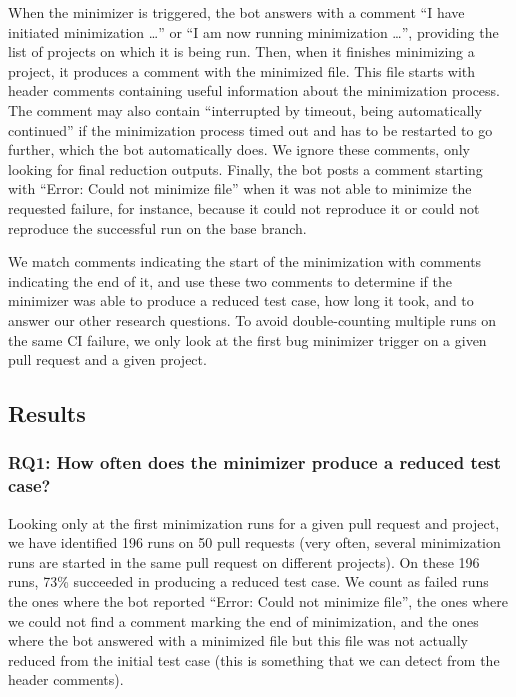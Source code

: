 \documentclass[a4paper,USenglish,cleveref,autoref,thm-restate]{lipics-v2021}
\begin{document}
When the minimizer is triggered, the bot answers with a comment ``I have initiated minimization \ldots'' or ``I am now running minimization \ldots'', providing the list of projects on which it is being run.
%
Then, when it finishes minimizing a project, it produces a comment with the minimized file.
%
This file starts with header comments containing useful information about the minimization process. %
%
The comment may also contain ``interrupted by timeout, being automatically continued'' if the minimization process timed out and has to be restarted to go further, which the bot automatically does.
%
We ignore these comments, only looking for final reduction outputs.
%
Finally, the bot posts a comment starting with ``Error: Could not minimize file'' when it was not able to minimize the requested failure, for instance, because it could not reproduce it or could not reproduce the successful run on the base branch.

We match comments indicating the start of the minimization with comments indicating the end of it, and use these two comments to determine if the minimizer was able to produce a reduced test case, how long it took, and to answer our other research questions.
To avoid double-counting multiple runs on the same CI failure, we only look at the first bug minimizer trigger on a given pull request and a given project.

\subsection{Results}

\subsubsection{RQ1: How often does the minimizer produce a reduced test case?}

Looking only at the first minimization runs for a given pull request and project, we have identified 196 runs on 50 pull requests (very often, several minimization runs are started in the same pull request on different projects).
On these 196 runs, 73\% succeeded in producing a reduced test case. We count as failed runs the ones where the bot reported ``Error: Could not minimize file'', the ones where we could not find a comment marking the end of minimization, and the ones where the bot answered with a minimized file but this file was not actually reduced from the initial test case (this is something that we can detect from the header comments).
\end{document}
